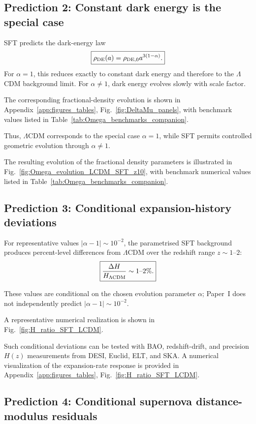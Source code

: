 \documentclass[12pt]{article}
\begin{document}
\subsection{Prediction 2: Constant dark energy is the special case}

SFT predicts the dark-energy law
\[
\boxed{
\rho_{\rm DE}(a)=\rho_{{\rm DE},0}a^{3(1-\alpha)}.
}
\]
For $\alpha=1$, this reduces exactly to constant dark energy and therefore
to the $\Lambda$CDM background limit. For $\alpha\neq1$, dark energy evolves
slowly with scale factor.

The corresponding fractional-density evolution is shown in
Appendix~\ref{app:figures_tables},
Fig.~\ref{fig:DeltaMu_panels}, with benchmark values
listed in Table~\ref{tab:Omega_benchmarks_companion}.

Thus, $\Lambda$CDM corresponds to the special case $\alpha=1$, while SFT
permits controlled geometric evolution through $\alpha\neq1$.

The resulting evolution of the fractional density parameters is
illustrated in Fig.~\ref{fig:Omega_evolution_LCDM_SFT_z10}, with
benchmark numerical values listed in
Table~\ref{tab:Omega_benchmarks_companion}.

\subsection{Prediction 3: Conditional expansion-history deviations}

For representative values $|\alpha-1|\sim10^{-2}$, the parametrised
SFT background produces percent-level differences from $\Lambda$CDM
over the redshift range $z\sim1$--$2$:
\[
\boxed{
\frac{\Delta H}{H_{\Lambda{\rm CDM}}}
\sim
1\text{--}2\%.
}
\]

These values are conditional on the chosen evolution parameter
$\alpha$; Paper~I does not independently predict
$|\alpha-1|\sim10^{-2}$.

A representative numerical realization is shown in
Fig.~\ref{fig:H_ratio_SFT_LCDM}.

Such conditional deviations can be tested with BAO, redshift-drift,
and precision $H(z)$ measurements from DESI, Euclid, ELT, and SKA.
A numerical visualization of the expansion-rate response is provided in
Appendix~\ref{app:figures_tables},
Fig.~\ref{fig:H_ratio_SFT_LCDM}.

\subsection{Prediction 4: Conditional supernova distance-modulus residuals}
\end{document}
